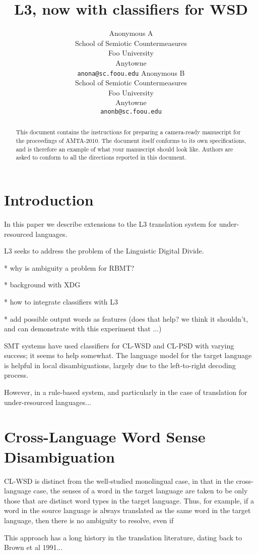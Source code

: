 \documentclass[11pt]{article}
\title{L3, now with classifiers for WSD}
\author{
  Anonymous A \\
  School of Semiotic Countermeasures\\
  Foo University \\
  Anytowne \\
  {\tt anona@sc.foou.edu}\And
  Anonymous B \\
  School of Semiotic Countermeasures\\
  Foo University \\
  Anytowne \\
  {\tt anonb@sc.foou.edu}}
\date{}
\begin{document}
\maketitle
\begin{abstract}
  This document contains the instructions for preparing a camera-ready
  manuscript for the proceedings of AMTA-2010. The document itself conforms to
  its own specifications, and is therefore an example of what your manuscript
  should look like.  Authors are asked to conform to all the directions
  reported in this document.
\end{abstract}


\section{Introduction}
In this paper we describe extensions to the L3 translation system for
under-resourced languages.

L3 seeks to address the problem of the Linguistic Digital Divide.

* why is ambiguity a problem for RBMT?


* background with XDG


* how to integrate classifiers with L3


* add possible output words as features (does that help? we think it shouldn’t,
and can demonstrate with this experiment that ...)


SMT systems have used classifiers for CL-WSD and CL-PSD with varying success;
it seems to help somewhat. The language model for the target language is
helpful in local disambiguations, largely due to the left-to-right decoding
process.

However, in a rule-based system, and particularly in the case of translation
for under-resourced languages...

\section{Cross-Language Word Sense Disambiguation}
CL-WSD is distinct from the well-studied monolingual case, in that in the
cross-language case, the senses of a word in the target language are taken to
be only those that are distinct word types in the target language. Thus, for
example, if a word in the source language is always translated as the same word
in the target language, then there is no ambiguity to resolve, even if 

This approach has a long history in the translation literature, dating back to
Brown et al 1991...
\end{document}

